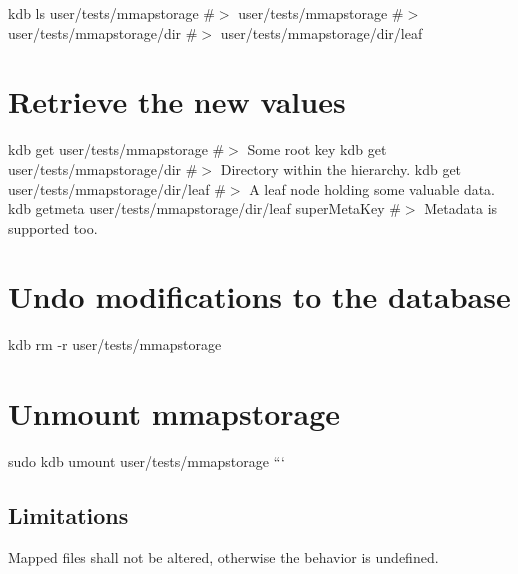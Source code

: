 kdb ls user/tests/mmapstorage \#$>$ user/tests/mmapstorage \#$>$ user/tests/mmapstorage/dir \#$>$ user/tests/mmapstorage/dir/leaf

\section*{Retrieve the new values}

kdb get user/tests/mmapstorage \#$>$ Some root key kdb get user/tests/mmapstorage/dir \#$>$ Directory within the hierarchy. kdb get user/tests/mmapstorage/dir/leaf \#$>$ A leaf node holding some valuable data. kdb getmeta user/tests/mmapstorage/dir/leaf super\+Meta\+Key \#$>$ Metadata is supported too.

\section*{Undo modifications to the database}

kdb rm -\/r user/tests/mmapstorage

\section*{Unmount mmapstorage}

sudo kdb umount user/tests/mmapstorage ```

\subsection*{Limitations}

Mapped files shall not be altered, otherwise the behavior is undefined. 